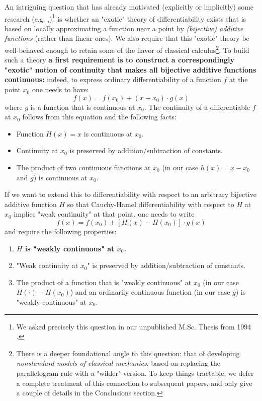 \documentclass[11pt]{amsart} %
\theoremstyle{definition}
\begin{document}
An intriguing question that has already motivated (explicitly or implicitly) some research (e.g. \cite{4},\cite{11})\footnote{We asked precisely this question in our unpublished M.Sc. Thesis from 1994 \cite{9}.} is whether an "exotic" theory of differentiability exists that is based on locally approximating a function near a point by  \emph{(bijective) additive functions} (rather than linear ones). We also require that  this "exotic" theory be well-behaved enough to retain some of the flavor of classical calculus\footnote{There is a deeper foundational angle to this question: that of developing \emph{nonstandard models of classical mechanics}, based on replacing the parallelogram rule with a "wilder" version. To keep things tractable, we defer a complete treatment of this connection to subsequent papers, and only give a couple of details in the Conclusions section.}. To build such a theory \textbf{a first requirement is to construct a correspondingly "exotic" notion of continuity that makes all bijective additive functions continuous:} indeed, to express ordinary differentiability of a function $f$ at the point $x_0$ one needs to have: 
\begin{equation} 
f(x)=f(x_0)+(x-x_0)\cdot g(x)
\end{equation} 
where $g$ is a function that is continuous at $x_0$. The continuity of a differentiable $f$ at $x_0$ follows from this equation and the following facts: 
\begin{itemize} 
\item Function $H(x)=x$ is continuous at $x_0$. 
\item Continuity at $x_0$ is preserved by addition/subtraction of constants. 
\item The product of two continuous functions at $x_0$ (in our case $h(x)=x-x_0$ and $g$) is continuous at $x_0$. 

\end{itemize} 
If we want to extend this to differentiability  with respect to an arbitrary bijective additive function $H$ so that Cauchy-Hamel differentiability with respect to $H$ at $x_0$ implies "weak continuity" at that point, 
 one needs to write 
\begin{equation} 
f(x)=f(x_0)+[H(x)-H(x_0)]\cdot g(x)
\end{equation} 
and require the following properties: 
\begin{enumerate} 
\item \textbf{$H$ is "weakly continuous" at $x_0$.} 
\item "Weak continuity at $x_0$" is preserved by addition/subtraction of constants.
\item The product of a function that is "weakly continuous" at $x_0$ (in our case $H(\cdot)-H(x_0)$) and an ordinarily continuous function (in our case $g$) is "weakly continuous" at $x_0$. 
 
\end{enumerate} 
\end{document}
